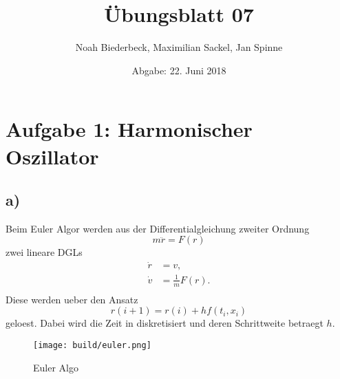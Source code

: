 \documentclass{scrartcl}
\title{Übungsblatt 07}
\author{%
		Noah Biederbeck, Maximilian Sackel, Jan Spinne
}
\date{Abgabe: 22. Juni 2018}
\begin{document}
\maketitle
\section*{Aufgabe 1: Harmonischer Oszillator}
\subsection*{a)}
Beim Euler Algor werden aus der Differentialgleichung zweiter Ordnung
\begin{equation}
		m \ddot{r} = F(r)
\end{equation}
zwei lineare DGLs
\begin{eqnarray}
		\dot{r} &= v,  \\
		\dot{v} &= \frac{1}{m} F(r). \\ 
\end{eqnarray}
Diese werden ueber den Ansatz 
\begin{equation}
		r(i+1) = r(i) + h f(t_i, x_i)
\end{equation}
geloest. Dabei wird die Zeit in diskretisiert und deren Schrittweite 
betraegt $h$.
\begin{figure}[ht]
		\centering
		\texttt{[image: build/euler.png]}
		\caption{Euler Algo}
		\label{fig:euler}
\end{figure}
\end{document}
